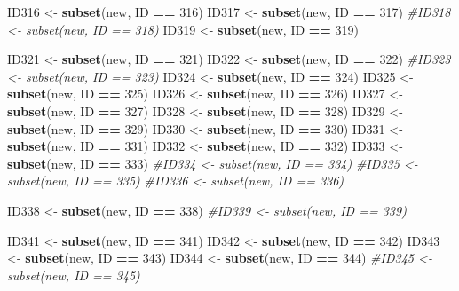 \documentclass[
]{book}
\newenvironment{Shaded}{\begin{snugshade}}{\end{snugshade}}
\newcommand{\CommentTok}[1]{\textcolor[rgb]{0.56,0.35,0.01}{\textit{#1}}}
\newcommand{\DecValTok}[1]{\textcolor[rgb]{0.00,0.00,0.81}{#1}}
\newcommand{\KeywordTok}[1]{\textcolor[rgb]{0.13,0.29,0.53}{\textbf{#1}}}
\newcommand{\NormalTok}[1]{#1}
\newcommand{\OperatorTok}[1]{\textcolor[rgb]{0.81,0.36,0.00}{\textbf{#1}}}
\newcommand{\StringTok}[1]{\textcolor[rgb]{0.31,0.60,0.02}{#1}}
\begin{document}
\begin{Shaded}
\begin{Highlighting}[]
{{{{{{\NormalTok{ID316 <-}\StringTok{ }\KeywordTok{subset}\NormalTok{(new, ID }\OperatorTok{==}\StringTok{ }\DecValTok{316}\NormalTok{)}
\NormalTok{ID317 <-}\StringTok{ }\KeywordTok{subset}\NormalTok{(new, ID }\OperatorTok{==}\StringTok{ }\DecValTok{317}\NormalTok{)}
\CommentTok{#ID318 <- subset(new, ID == 318)}
\NormalTok{ID319 <-}\StringTok{ }\KeywordTok{subset}\NormalTok{(new, ID }\OperatorTok{==}\StringTok{ }\DecValTok{319}\NormalTok{)}

\NormalTok{ID321 <-}\StringTok{ }\KeywordTok{subset}\NormalTok{(new, ID }\OperatorTok{==}\StringTok{ }\DecValTok{321}\NormalTok{)}
\NormalTok{ID322 <-}\StringTok{ }\KeywordTok{subset}\NormalTok{(new, ID }\OperatorTok{==}\StringTok{ }\DecValTok{322}\NormalTok{)}
\CommentTok{#ID323 <- subset(new, ID == 323)}
\NormalTok{ID324 <-}\StringTok{ }\KeywordTok{subset}\NormalTok{(new, ID }\OperatorTok{==}\StringTok{ }\DecValTok{324}\NormalTok{)}
\NormalTok{ID325 <-}\StringTok{ }\KeywordTok{subset}\NormalTok{(new, ID }\OperatorTok{==}\StringTok{ }\DecValTok{325}\NormalTok{)}
\NormalTok{ID326 <-}\StringTok{ }\KeywordTok{subset}\NormalTok{(new, ID }\OperatorTok{==}\StringTok{ }\DecValTok{326}\NormalTok{)}
\NormalTok{ID327 <-}\StringTok{ }\KeywordTok{subset}\NormalTok{(new, ID }\OperatorTok{==}\StringTok{ }\DecValTok{327}\NormalTok{)}
\NormalTok{ID328 <-}\StringTok{ }\KeywordTok{subset}\NormalTok{(new, ID }\OperatorTok{==}\StringTok{ }\DecValTok{328}\NormalTok{) }
\NormalTok{ID329 <-}\StringTok{ }\KeywordTok{subset}\NormalTok{(new, ID }\OperatorTok{==}\StringTok{ }\DecValTok{329}\NormalTok{)}
\NormalTok{ID330 <-}\StringTok{ }\KeywordTok{subset}\NormalTok{(new, ID }\OperatorTok{==}\StringTok{ }\DecValTok{330}\NormalTok{)}
\NormalTok{ID331 <-}\StringTok{ }\KeywordTok{subset}\NormalTok{(new, ID }\OperatorTok{==}\StringTok{ }\DecValTok{331}\NormalTok{)}
\NormalTok{ID332 <-}\StringTok{ }\KeywordTok{subset}\NormalTok{(new, ID }\OperatorTok{==}\StringTok{ }\DecValTok{332}\NormalTok{)}
\NormalTok{ID333 <-}\StringTok{ }\KeywordTok{subset}\NormalTok{(new, ID }\OperatorTok{==}\StringTok{ }\DecValTok{333}\NormalTok{)}
\CommentTok{#ID334 <- subset(new, ID == 334)}
\CommentTok{#ID335 <- subset(new, ID == 335)}
\CommentTok{#ID336 <- subset(new, ID == 336)}

\NormalTok{ID338 <-}\StringTok{ }\KeywordTok{subset}\NormalTok{(new, ID }\OperatorTok{==}\StringTok{ }\DecValTok{338}\NormalTok{)}
\CommentTok{#ID339 <- subset(new, ID == 339)}

\NormalTok{ID341 <-}\StringTok{ }\KeywordTok{subset}\NormalTok{(new, ID }\OperatorTok{==}\StringTok{ }\DecValTok{341}\NormalTok{)}
\NormalTok{ID342 <-}\StringTok{ }\KeywordTok{subset}\NormalTok{(new, ID }\OperatorTok{==}\StringTok{ }\DecValTok{342}\NormalTok{)}
\NormalTok{ID343 <-}\StringTok{ }\KeywordTok{subset}\NormalTok{(new, ID }\OperatorTok{==}\StringTok{ }\DecValTok{343}\NormalTok{)}
\NormalTok{ID344 <-}\StringTok{ }\KeywordTok{subset}\NormalTok{(new, ID }\OperatorTok{==}\StringTok{ }\DecValTok{344}\NormalTok{)}
\CommentTok{#ID345 <- subset(new, ID == 345)}

}}}}}}
\end{Highlighting}
\end{Shaded}
\end{document}
